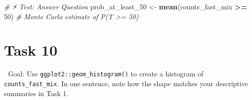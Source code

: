 \documentclass[
  12pt,
]{scrreprt}
\newenvironment{Shaded}{\begin{snugshade}}{\end{snugshade}}
\newcommand{\CommentTok}[1]{\textcolor[rgb]{0.56,0.35,0.01}{\textit{#1}}}
\newcommand{\DecValTok}[1]{\textcolor[rgb]{0.00,0.00,0.81}{#1}}
\newcommand{\FunctionTok}[1]{\textcolor[rgb]{0.13,0.29,0.53}{\textbf{#1}}}
\newcommand{\NormalTok}[1]{#1}
\newcommand{\OtherTok}[1]{\textcolor[rgb]{0.56,0.35,0.01}{#1}}
\newcommand{\SpecialCharTok}[1]{\textcolor[rgb]{0.81,0.36,0.00}{\textbf{#1}}}
\begin{document}
\begin{Shaded}
\begin{Highlighting}[]
\CommentTok{\# ⚡ Test:  Answer Question}
\NormalTok{prob\_at\_least\_50 }\OtherTok{\textless{}{-}} \FunctionTok{mean}\NormalTok{(counts\_fast\_mix }\SpecialCharTok{\textgreater{}=} \DecValTok{50}\NormalTok{)    }\CommentTok{\# Monte Carlo estimate of P(T \textgreater{}= 50)  }
\end{Highlighting}
\end{Shaded}

\section{Task 10}\label{task-10}

🎯 Goal: Use \texttt{ggplot2::geom\_histogram()} to create a histogram of \texttt{counts\_fast\_mix}. In one sentence, note how the shape matches your descriptive summaries in Task 1.
\end{document}
